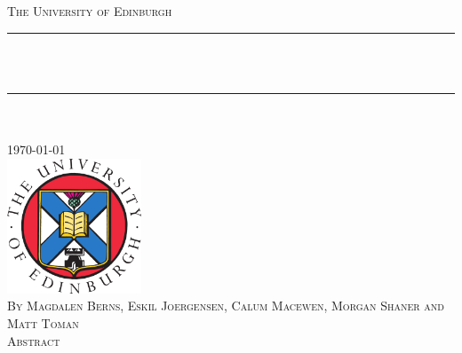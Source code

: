 \documentclass[11pt, a4paper, oneside]{Thesis}
\title{\ttitle}
\begin{document}
\frontmatter %
\fancyhead{} %
\rhead{\thepage} %
\lhead{} %
\pagestyle{fancy}
\newcommand{\HRule}{\rule{\linewidth}{0.5mm}} %




\begin{titlepage}
\begin{center}

\textsc{\LARGE The University of Edinburgh}\\[1.5cm]
\HRule \\[0.8cm] %

\textsc{\huge \ttitle }\\[0.2cm]
\HRule \\[0.5cm] %
\textsc{\Large \deptname}\\[1.0cm]

\large \today \\[1cm]

\includegraphics[width=4.0cm]{logo}\\[1cm]

\textsc{\small By Magdalen Berns, Eskil Joergensen, Calum Macewen, Morgan Shaner and Matt Toman} \\[1cm]

\textsc{\Large{Abstract}}\\
\end{center}


\end{titlepage}
\end{document}
